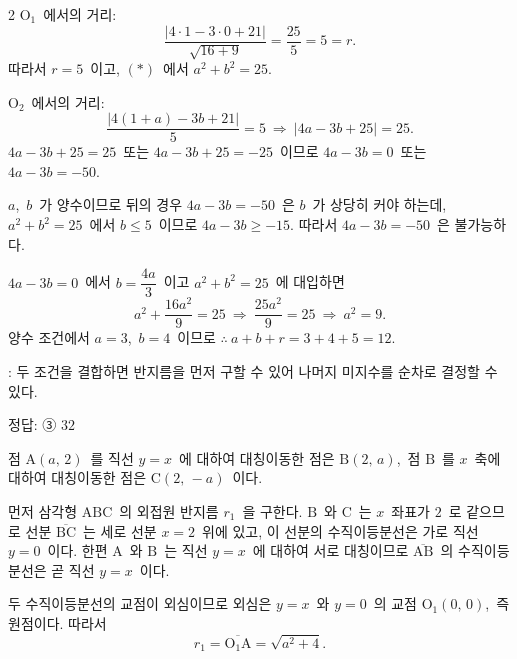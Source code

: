 \documentclass[10pt,fleqn]{article}
\begin{document}
\begin{multicols*}{2}
$\mathrm{O}_1$\ 에서의 거리:
\[ \dfrac{|4 \cdot 1 - 3 \cdot 0 + 21|}{\sqrt{16 + 9}} = \dfrac{25}{5} = 5 = r. \]
따라서 $r = 5$\ 이고, $(\ast)$\ 에서 $a^2 + b^2 = 25$.

$\mathrm{O}_2$\ 에서의 거리:
\[ \dfrac{|4(1+a) - 3b + 21|}{5} = 5\ \Longrightarrow\ |4a - 3b + 25| = 25. \]
$4a - 3b + 25 = 25$\ 또는 $4a - 3b + 25 = -25$\ 이므로 $4a - 3b = 0$\ 또는 $4a - 3b = -50$.

$a$,\ $b$\ 가 양수이므로 뒤의 경우 $4a - 3b = -50$\ 은 $b$\ 가 상당히 커야 하는데, $a^2+b^2=25$\ 에서 $b \le 5$\ 이므로 $4a - 3b \ge -15$. 따라서 $4a - 3b = -50$\ 은 불가능하다.

$4a - 3b = 0$\ 에서 $b = \dfrac{4a}{3}$\ 이고 $a^2 + b^2 = 25$\ 에 대입하면
\[ a^2 + \dfrac{16a^2}{9} = 25\ \Longrightarrow\ \dfrac{25a^2}{9} = 25\ \Longrightarrow\ a^2 = 9. \]
양수 조건에서 $a = 3$,\ $b = 4$\ 이므로 $\therefore\ a + b + r = 3 + 4 + 5 = 12$.

\begin{dmcriticalpoint}
: 두 조건을 결합하면 반지름을 먼저 구할 수 있어 나머지 미지수를 순차로 결정할 수 있다.
\end{dmcriticalpoint}

\begin{dmanswerbox}
정답: ③ $32$
\end{dmanswerbox}

점 $\mathrm{A}(a,\,2)$\ 를 직선 $y = x$\ 에 대하여 대칭이동한 점은 $\mathrm{B}(2,\,a)$,\ 점 $\mathrm{B}$\ 를 $x$\ 축에 대하여 대칭이동한 점은 $\mathrm{C}(2,\,-a)$\ 이다.

먼저 삼각형 $\mathrm{ABC}$\ 의 외접원 반지름 $r_1$\ 을 구한다. $\mathrm{B}$\ 와 $\mathrm{C}$\ 는 $x$\ 좌표가 $2$\ 로 같으므로 선분 $\overline{\mathrm{BC}}$\ 는 세로 선분 $x = 2$\ 위에 있고, 이 선분의 수직이등분선은 가로 직선 $y = 0$\ 이다. 한편 $\mathrm{A}$\ 와 $\mathrm{B}$\ 는 직선 $y = x$\ 에 대하여 서로 대칭이므로 $\overline{\mathrm{AB}}$\ 의 수직이등분선은 곧 직선 $y = x$\ 이다.

두 수직이등분선의 교점이 외심이므로 외심은 $y = x$\ 와 $y = 0$\ 의 교점 $\mathrm{O}_1(0,\,0)$,\ 즉 원점이다. 따라서
\[ r_1 = \overline{\mathrm{O}_1\mathrm{A}} = \sqrt{a^2 + 4}. \]


\end{multicols*}
\end{document}
